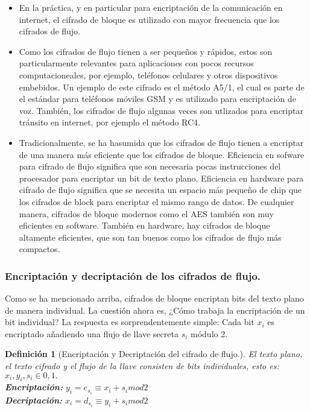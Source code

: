 \documentclass{llncs}
\theoremstyle{plane}
\newtheorem{defi}{Definición}
\begin{document}
\begin{itemize}
\item En la práctica, y en particular para encriptación de la comunicación en internet, el cifrado de bloque es utilizado con mayor frecuencia que los cifrados de flujo.
\item Como los cifrados de flujo tienen a ser pequeños y rápidos, estos son particularmente relevantes para aplicaciones con pocos recursos computacioneales, por ejemplo, teléfonos celulares y otros dispositivos embebidos. Un ejemplo de este cifrado es el método A5/1, el cual es parte de el estándar para teléfonos móviles GSM y es utilizado para encriptación de voz. También, los cifrados de flujo algunas veces son utlizados para encriptar tránsito en internet, por ejemplo el método RC4.

\item Tradicionalmente, se ha hasumida que los cifrados de flujo tienen a encriptar de una manera más eficiente que los cifrados de bloque. Eficiencia en sofware para cifrado de flujo significa que son necesaria pocas instrucciones del procesador para encriptar un bit de texto plano. Eficiencia en hardware para cifrado de flujo significa que se necesita un espacio más pequeño de chip que los cifrados de block para encriptar el mismo rango de datos. De cualquier manera, cifrados de bloque modernos como el AES también son muy eficientes en software. También en hardware, hay cifrados de bloque altamente eficientes, que son tan buenos como los cifrados de flujo más compactos.
\end{itemize}

\subsubsection{Encriptación y decriptación de los cifrados de flujo.}

Como se ha mencionado arriba, cifrados de bloque encriptan bits del texto plano de manera individual. La cuestión ahora es, ¿Cómo trabaja la encriptación de un bit individual? La respuesta es sorprendentemente simple: Cada bit $x_{i}$ es encriptado añadiendo una flujo de llave secreta $s_{i}$ módulo 2.


\begin{defi}[Encriptación y Decriptación del cifrado de flujo.]
El texto plano, el texto cifrado y el flujo de la llave consisten de bits individuales, esto es: $x_{i}, y_{i}, s_{i}  \in {0,1}.$\\
\textbf{Encriptación:} $y_{i}= e_{s_{i}} \equiv x_{i} + s_{i} mod 2$ \\
\textbf{Decriptación:} $x_{i}= d_{s_{i}} \equiv y_{i} + s_{i} mod 2$ 
\end{defi}
\end{document}

